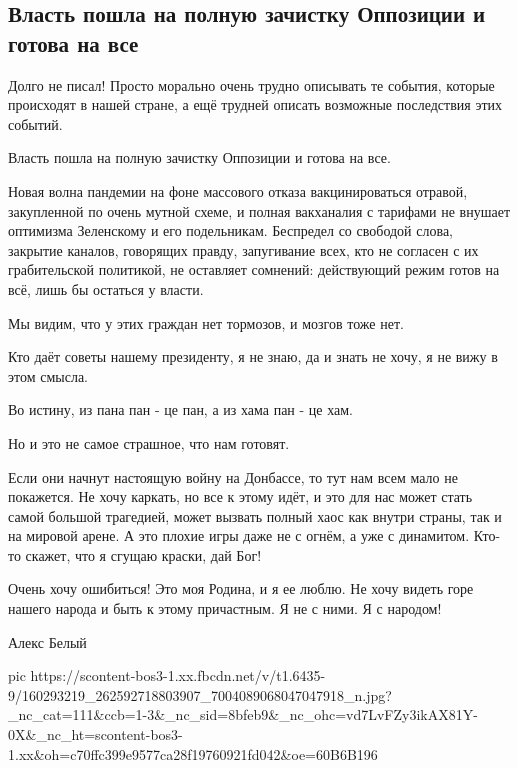 
 
 
 
 

\subsection{Власть пошла на полную зачистку Оппозиции и готова на все}
\label{sec:12_03_2021.fb.belyj_aleks.1.vlast_oppozicia}

Долго не писал! Просто морально очень трудно описывать те события, которые
происходят в нашей стране, а ещё трудней описать возможные последствия этих
событий.  

Власть пошла на полную зачистку Оппозиции и готова на все.

Новая волна пандемии на фоне массового отказа вакцинироваться отравой,
закупленной по очень мутной схеме, и полная вакханалия с тарифами не внушает
оптимизма Зеленскому и его подельникам. Беспредел со свободой слова, закрытие
каналов, говорящих правду, запугивание всех, кто не согласен с их грабительской
политикой, не оставляет сомнений: действующий режим готов на всё, лишь бы
остаться у власти. 

Мы видим, что у этих граждан нет тормозов, и мозгов тоже нет. 

Кто даёт советы нашему президенту, я не знаю, да и знать не хочу, я не вижу в
этом смысла.  

Во истину, из пана пан - це пан, а из хама пан - це хам.  

Но и это не самое страшное, что нам готовят. 

Если они начнут настоящую войну на Донбассе, то тут нам всем мало не покажется.
Не хочу каркать, но все к этому идёт, и это для нас может стать самой большой
трагедией, может вызвать полный хаос как внутри страны, так и на мировой арене.
А это плохие игры даже не с огнём, а уже с динамитом. Кто-то скажет, что я
сгущаю краски, дай Бог! 

Очень хочу ошибиться! Это моя Родина, и я ее люблю. Не хочу видеть горе нашего
народа и быть к этому причастным. Я не с ними. Я с народом!

Алекс Белый


\ifcmt
  pic https://scontent-bos3-1.xx.fbcdn.net/v/t1.6435-9/160293219_262592718803907_7004089068047047918_n.jpg?_nc_cat=111&ccb=1-3&_nc_sid=8bfeb9&_nc_ohc=vd7LvFZy3ikAX81Y-0X&_nc_ht=scontent-bos3-1.xx&oh=c70ffc399e9577ca28f19760921fd042&oe=60B6B196
\fi


